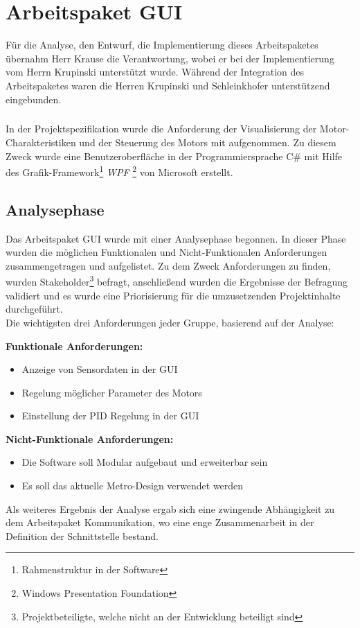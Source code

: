 \graphicspath{{./gui/Bilder/}}

\chapter{Arbeitspaket GUI}
Für die Analyse, den Entwurf, die Implementierung dieses Arbeitspaketes übernahm Herr Krause die Verantwortung, wobei er bei der Implementierung vom Herrn Krupinski unterstützt wurde. Während der Integration des Arbeitspaketes waren die Herren Krupinski und Schleinkhofer unterstützend eingebunden.
\paragraph{}
In der Projektspezifikation wurde die Anforderung der Visualisierung der Motor-Charakteristiken und der Steuerung des Motors mit aufgenommen. Zu diesem Zweck wurde eine Benutzeroberfläche in der Programmiersprache C\# mit Hilfe des Grafik-Framework\footnote{Rahmenstruktur in der Software} \textit{WPF} \footnote{Windows Presentation Foundation} von Microsoft erstellt.

\section{Analysephase}
Das Arbeitspaket GUI wurde mit einer Analysephase begonnen. In dieser Phase wurden die möglichen Funktionalen und Nicht-Funktionalen Anforderungen zusammengetragen und aufgelistet. Zu dem Zweck Anforderungen zu finden, wurden Stakeholder\footnote{Projektbeteiligte, welche nicht an der Entwicklung beteiligt sind} befragt, anschließend wurden die Ergebnisse der Befragung validiert und es wurde eine Priorisierung für die umzusetzenden Projektinhalte durchgeführt.\\
Die wichtigsten drei Anforderungen jeder Gruppe, basierend auf der Analyse:\\

\begin{minipage}[t]{0.5\textwidth}
\textbf{Funktionale Anforderungen:}
\begin{itemize}
	\item Anzeige von Sensordaten in der GUI
	\item Regelung möglicher Parameter des Motors
	\item Einstellung der PID Regelung in der GUI
	\end{itemize} 
\end{minipage}\begin{minipage}[t]{0.5\textwidth}
\textbf{Nicht-Funktionale Anforderungen:}
\begin{itemize}
	\item Die Software soll Modular aufgebaut und erweiterbar sein
	\item Es soll das aktuelle Metro-Design verwendet werden
\end{itemize} 
\end{minipage}
\newline
\newline
Als weiteres Ergebnis der Analyse ergab sich eine zwingende Abhängigkeit zu dem Arbeitspaket Kommunikation, wo eine enge Zusammenarbeit in der Definition der Schnittstelle bestand.


